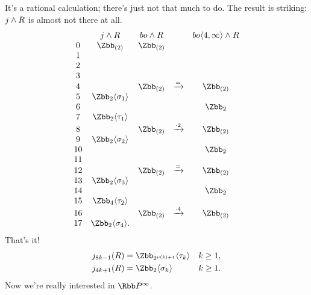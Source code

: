 It's a rational calculation; there's just not that much to do.  The result is striking: $j \wedge R$ is almost not there at all.
\[
\begin{array}{ccccc}
& j \sprod R & bo \sprod R & & bo \langle 4, \infty \rangle \sprod R \\
0 & \Zbb_{(2)} & \Zbb_{(2)} \\
1 \\
2 \\
3 \\
4 & & \Zbb_{(2)} & \xrightarrow{=} & \Zbb_{(2)} \\
5 & \Zbb_2 \langle \sigma_1 \rangle \\
6 & & & & \Zbb_2 \\
7 & \Zbb_2 \langle \tau_1 \rangle \\
8 & & \Zbb_{(2)} & \xrightarrow{\cdot 2} & \Zbb_{(2)} \\
9 & \Zbb_2 \langle \sigma_2 \rangle \\
10 & & & & \Zbb_2 \\
11 \\
12 & & \Zbb_{(2)} & \xrightarrow{=} & \Zbb_{(2)} \\
13 & \Zbb_2 \langle \sigma_3 \rangle \\
14 & & & & \Zbb_2 \\
15 & \Zbb_4 \langle \tau_2 \rangle \\
16 & & \Zbb_{(2)} & \xrightarrow{\cdot 4} & \Zbb_{(2)} \\
17 & \Zbb_2 \langle \sigma_4 \rangle.
\end{array}
\]
That's it!
\begin{align*}
j_{8k-1}(R) & = \Zbb_{2^{\nu(k)+1}} \langle \tau_k \rangle & k \ge 1, \\
j_{4k+1}(R) & = \Zbb_2 \langle \sigma_k \rangle & k \ge 1.
\end{align*}
Now we're really interested in $\RP^\infty$.
